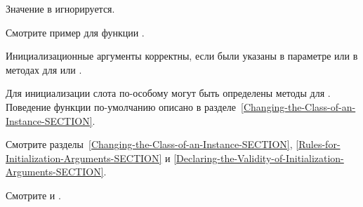 \begin{defun}
Значение  в 
игнорируется.

Смотрите пример для функции .

Инициализационные аргументы корректны, если были указаны в параметре
 или в методах для  или
. 

Для инициализации слота по-особому могут быть определены методы для
. Поведение функции 
по-умолчанию описано в разделе~\ref{Changing-the-Class-of-an-Instance-SECTION}.

Смотрите разделы~\ref{Changing-the-Class-of-an-Instance-SECTION},
\ref{Rules-for-Initialization-Arguments-SECTION} и
\ref{Declaring-the-Validity-of-Initialization-Arguments-SECTION}.

Смотрите  и .
\end{defun}


